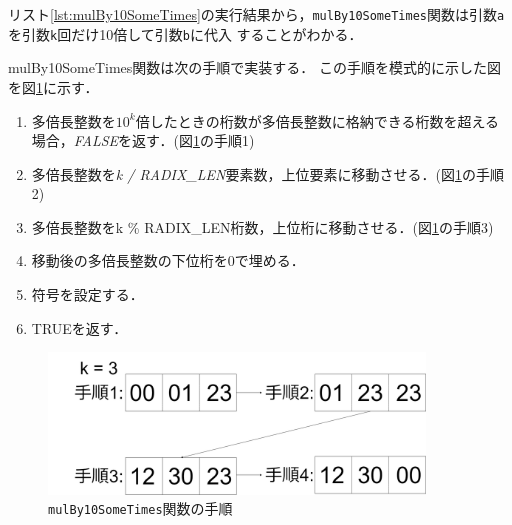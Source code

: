 \documentclass[a4paper,11pt,dvipdfmx]{jsarticle}
\begin{document}
リスト\ref{lst:mulBy10SomeTimes}の実行結果から，\texttt{mulBy10SomeTimes}関数は引数\texttt{a}を引数\texttt{k}回だけ10倍して引数\texttt{b}に代入
することがわかる．

mulBy10SomeTimes関数は次の手順で実装する．
この手順を模式的に示した図を図\ref{fig:mulBy10SomeTimes1}に示す．
\begin{enumerate}
  \item 多倍長整数を$10^k$倍したときの桁数が多倍長整数に格納できる桁数を超える場合，\textit{FALSE}を返す．(図\ref{fig:mulBy10SomeTimes1}の手順1)
  \item 多倍長整数を\textit{k / RADIX\_LEN}要素数，上位要素に移動させる．(図\ref{fig:mulBy10SomeTimes1}の手順2)
  \item 多倍長整数をk \% RADIX\_LEN桁数，上位桁に移動させる．(図\ref{fig:mulBy10SomeTimes1}の手順3)
  \item 移動後の多倍長整数の下位桁を0で埋める．
  \item 符号を設定する．
  \item TRUEを返す．
\end{enumerate}

\begin{figure}[H]
  \centering
  \includegraphics[width=10cm]{./images/mulby10sometimes1.drawio.png}
  \caption{\texttt{mulBy10SomeTimes}関数の手順}
  \label{fig:mulBy10SomeTimes1}
\end{figure}
\end{document}
